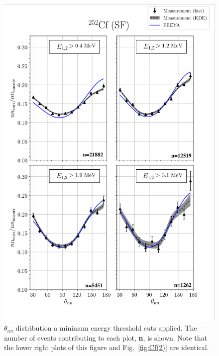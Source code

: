 \begin{figure}
\centering
    \includegraphics[width = \figsize\textwidth]{FinalCf252Resultw_freya0KDE(fix).png}
    \caption{
    $\theta_{nn}$ distribution a minimum energy threshold cuts applied.
    The number of events contributing to each plot, \textbf{n}, is shown.  Note that the lower right plots of this figure and Fig.~\ref{fig:Cf(2)} are identical.}
    \label{fig:Cf(0)}
\end{figure}

